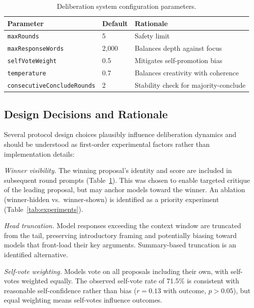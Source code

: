 \documentclass[11pt,a4paper]{article}
\begin{document}
\begin{table}[ht]
\centering
\caption{Deliberation system configuration parameters.}
\label{tab:config}
\begin{tabular}{@{}llp{5.5cm}@{}}
\toprule
\textbf{Parameter} & \textbf{Default} & \textbf{Rationale} \\
\midrule
\texttt{maxRounds} & 5 & Safety limit \\
\texttt{maxResponseWords} & 2{,}000 & Balances depth against focus \\
\texttt{selfVoteWeight} & 0.5 & Mitigates self-promotion bias \\
\texttt{temperature} & 0.7 & Balances creativity with coherence \\
\texttt{consecutiveConcludeRounds} & 2 & Stability check for majority-conclude \\
\bottomrule
\end{tabular}
\end{table}

\subsection{Design Decisions and Rationale}
\label{sec:design_decisions}

Several protocol design choices plausibly influence deliberation dynamics and should be understood as first-order experimental factors rather than implementation details:

\textit{Winner visibility.} The winning proposal's identity and score are included in subsequent round prompts (Table~\ref{tab:config}). This was chosen to enable targeted critique of the leading proposal, but may anchor models toward the winner. An ablation (winner-hidden vs.\ winner-shown) is identified as a priority experiment (Table~\ref{tab:experiments}).

\textit{Head truncation.} Model responses exceeding the context window are truncated from the tail, preserving introductory framing and potentially biasing toward models that front-load their key arguments. Summary-based truncation is an identified alternative.

\textit{Self-vote weighting.} Models vote on all proposals including their own, with self-votes weighted equally. The observed self-vote rate of 71.5\% is consistent with reasonable self-confidence rather than bias ($r = 0.13$ with outcome, $p > 0.05$), but equal weighting means self-votes influence outcomes.

\end{document}
